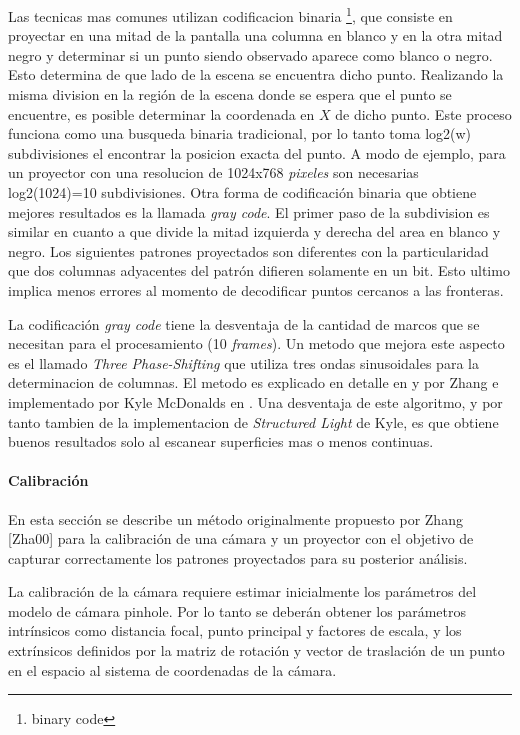 Las tecnicas mas comunes utilizan codificacion binaria \footnote{binary code}, que consiste en proyectar en una mitad de la pantalla una columna en blanco y en la otra mitad negro y determinar si un punto siendo observado aparece como blanco o negro. Esto determina de que lado de la escena se encuentra dicho punto. Realizando la misma division en la región de la escena donde se espera que el punto se encuentre, es posible determinar la coordenada en $X$ de dicho punto. Este proceso funciona como una busqueda binaria tradicional, por lo tanto toma log2(w) subdivisiones el encontrar la posicion exacta del punto. A modo de ejemplo, para un proyector con una resolucion de 1024x768 \emph{pixeles} son necesarias log2(1024)=10 subdivisiones. Otra forma de codificación binaria que obtiene mejores resultados es la llamada \emph{gray code}. El primer paso de la subdivision es similar en cuanto a que divide la mitad izquierda y derecha del area en blanco y negro. Los siguientes patrones proyectados son diferentes con la particularidad que dos columnas adyacentes del patrón difieren solamente en un bit. Esto ultimo implica menos errores al momento de decodificar puntos cercanos a las fronteras.  

La codificación \emph{gray code} tiene la desventaja de la cantidad de marcos que se necesitan para el procesamiento (10 \emph{frames}). Un metodo que mejora este aspecto es el llamado \emph{Three Phase-Shifting} que utiliza tres ondas sinusoidales para la determinacion de columnas. El metodo es explicado en detalle en \cite{3DShapeMeasurement} y \cite{SLThreeStepPhaseShift} por Zhang e implementado por Kyle McDonalds en \cite{KyleMcDonald}. Una desventaja de este algoritmo, y por tanto tambien de la implementacion de \emph{Structured Light} de Kyle, es que obtiene buenos resultados solo al escanear superficies mas o menos continuas.

\paragraph{Calibración}

En esta sección se describe un método originalmente propuesto por Zhang [Zha00] para la calibración de una cámara y un proyector con el objetivo de capturar correctamente los patrones proyectados para su posterior análisis. 

La calibración de la cámara requiere estimar inicialmente los parámetros del modelo de cámara pinhole. Por lo tanto se deberán obtener los parámetros intrínsicos como distancia focal, punto principal y factores de escala, y los extrínsicos definidos por la matriz de rotación y vector de traslación de un punto en el espacio al sistema de coordenadas de la cámara. 

